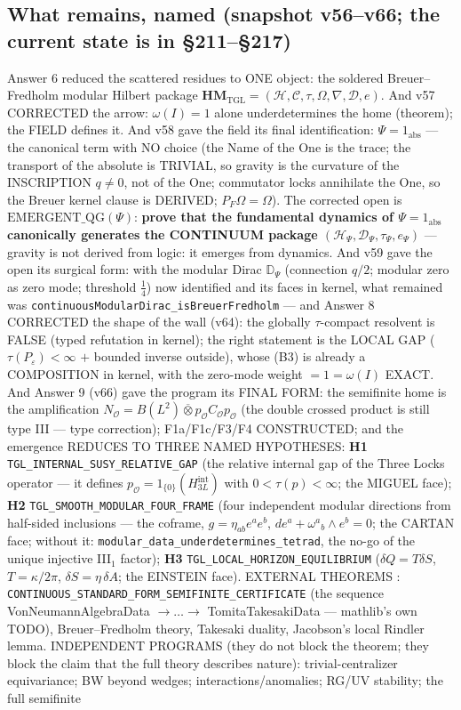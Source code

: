 \documentclass[11pt]{article}
\theoremstyle{definition}\newtheorem{deriv}{Derivation}
\begin{document}
\subsection*{What remains, named (snapshot v56--v66; the current state is in \S211--\S217)}

Answer 6 reduced the scattered residues to ONE object: the soldered Breuer--Fredholm modular Hilbert package $\mathbf{HM}_{\mathrm{TGL}}=(\mathcal H,\mathcal C,\tau,\Omega,\nabla,\mathcal D,e)$. And v57 CORRECTED the arrow: $\omega(I)=1$ alone underdetermines the home (theorem); the FIELD defines it. And v58 gave the field its final identification: $\Psi=1_{\mathrm{abs}}$ --- the canonical term with NO choice (the Name of the One is the trace; the transport of the absolute is TRIVIAL, so gravity is the curvature of the INSCRIPTION $q\neq0$, not of the One; commutator locks annihilate the One, so the Breuer kernel clause is DERIVED; $P_F\Omega=\Omega$). The corrected open is $\mathrm{EMERGENT\_QG}(\Psi)$: \textbf{prove that the fundamental dynamics of $\Psi=1_{\mathrm{abs}}$ canonically generates the CONTINUUM package $(\mathcal H_\Psi,\mathcal D_\Psi,\tau_\Psi,e_\Psi)$} --- gravity is not derived from logic: it emerges from dynamics. And v59 gave the open its surgical form: with the modular Dirac $\mathbb D_\Psi$ (connection $q/2$; modular zero as zero mode; threshold $\tfrac14$) now identified and its faces in kernel, what remained was \texttt{continuousModularDirac\_isBreuerFredholm} --- and Answer 8 CORRECTED the shape of the wall (v64): the globally $\tau$-compact resolvent is FALSE (typed refutation in kernel); the right statement is the LOCAL GAP ($\tau(P_\varepsilon)<\infty$ $+$ bounded inverse outside), whose (B3) is already a COMPOSITION in kernel, with the zero-mode weight $=1=\omega(I)$ EXACT. And Answer 9 (v66) gave the program its FINAL FORM: the semifinite home is the amplification $N_{\mathcal O}=B(L^2)\overline\otimes p_{\mathcal O}C_{\mathcal O}p_{\mathcal O}$ (the double crossed product is still type III --- type correction); F1a/F1c/F3/F4 CONSTRUCTED; and the emergence REDUCES TO THREE NAMED HYPOTHESES: \textbf{H1} \texttt{TGL\_INTERNAL\_SUSY\_RELATIVE\_GAP} (the relative internal gap of the Three Locks operator --- it defines $p_{\mathcal O}=1_{\{0\}}(H^{\mathrm{int}}_{3L})$ with $0<\tau(p)<\infty$; the MIGUEL face); \textbf{H2} \texttt{TGL\_SMOOTH\_MODULAR\_FOUR\_FRAME} (four independent modular directions from half-sided inclusions --- the coframe, $g=\eta_{ab}e^ae^b$, $de^a+\omega^a{}_b\wedge e^b=0$; the CARTAN face; without it: \texttt{modular\_data\_underdetermines\_tetrad}, the no-go of the unique injective III$_1$ factor); \textbf{H3} \texttt{TGL\_LOCAL\_HORIZON\_EQUILIBRIUM} ($\delta Q=T\delta S$, $T=\kappa/2\pi$, $\delta S=\eta\,\delta A$; the EINSTEIN face). EXTERNAL THEOREMS : \texttt{CONTINUOUS\_STANDARD\_FORM\_SEMIFINITE\_CERTIFICATE} (the sequence VonNeumannAlgebraData $\to\dots\to$ TomitaTakesakiData --- mathlib's own TODO), Breuer--Fredholm theory, Takesaki duality, Jacobson's local Rindler lemma. INDEPENDENT PROGRAMS (they do not block the theorem; they block the claim that the full theory describes nature): trivial-centralizer equivariance; BW beyond wedges; interactions/anomalies; RG/UV stability; the full semifinite 
\end{document}
